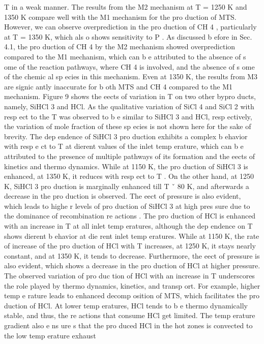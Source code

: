 \documentclass[10pt, letterpaper]{article}
\begin{document}
T
in a weak manner.
The results from the M2 mechanism at
T
= 1250 K and 1350 K compare well with the M1 mechanism
for the pro duction of MTS. However, we can observe overprediction in the pro duction of CH
4
, particularly
at
T
= 1350 K, which als o shows sensitivity to
P
. As discussed b efore in Sec. 4.1, the pro duction of CH
4
by
the M2 mechanism showed overprediction compared to the M1 mechanism, which can b e attributed to the
absence of s ome of the reaction pathways, where CH
4
is involved, and the absence of s ome of the chemic al
sp ecies in this mechanism. Even at 1350 K, the results from M3 are signic antly inaccurate for b oth MTS
and CH
4
compared to the M1 mechanism.
Figure 9 shows the eects of variation in 
T
on two other bypro ducts, namely, SiHCl
3
and HCl. As the
qualitative variation of SiCl
4
and SiCl
2
with resp ect to the 
T
was observed to b e similar to SiHCl
3
and
HCl, resp ectively, the variation of mole fraction of these sp ecies is not shown here for the sake of brevity.
The dep endence of SiHCl
3
pro duction exhibits a complex b ehavior with resp e ct to 
T
at dierent values
of the inlet temp erature, which can b e attributed to the presence of multiple pathways of its formation and
the eects of kinetics and thermo dynamics. While at 1150 K, the pro duction of SiHCl
3
is enhanced, at
1350 K, it reduces with resp ect to 
T
. On the other hand, at 1250 K, SiHCl
3
pro duction is marginally
enhanced till 
T
ˇ
80 K, and afterwards a decrease in the pro duction is observed. The eect of pressure is
also evident, which leads to highe r levels of pro duction of SiHCl
3
at high pres sure due to the dominance of
recombination re actions .
The pro duction of HCl is enhanced with an increase in 
T
at all inlet temp eratures, although the
dep endence on 
T
shows dierent b ehavior at die rent inlet temp eratures. While at 1150 K, the rate of
increase of the pro duction of HCl with 
T
increases, at 1250 K, it stays nearly constant, and at 1350 K, it
tends to decrease. Furthermore, the eect of pressure is also evident, which shows a decrease in the pro duction
of HCl at higher pressure. The observed variation of pro duc tion of HCl with an increase in 
T
underscores
the role played by thermo dynamics, kinetics, and transp ort. For example, higher temp e rature leads to
enhanced decomp osition of MTS, which facilitates the pro duction of HCl. At lower temp eratures, HCl tends
to b e thermo dynamically stable, and thus, the re actions that consume HCl get limited. The temp erature
gradient also e ns ure s that the pro duced HCl in the hot zones is convected to the low temp erature exhaust
\end{document}
